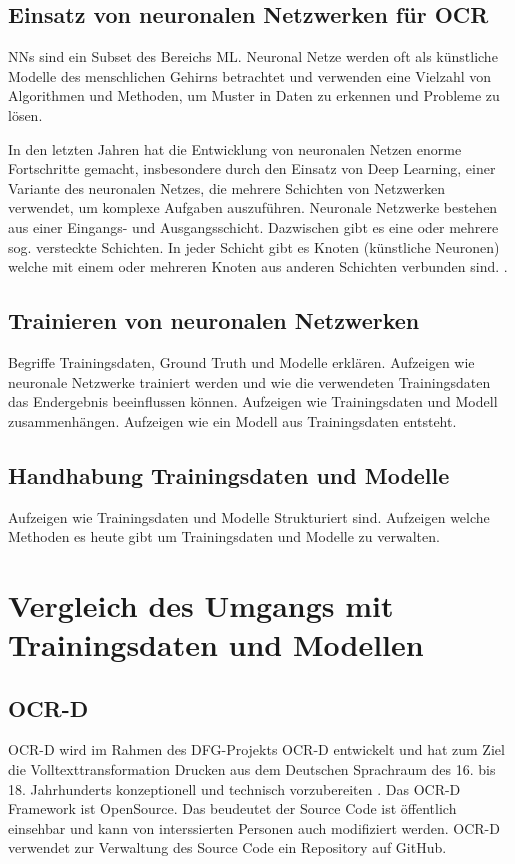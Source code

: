 \documentclass[a4paper,oneside, 12pt]{report}
\begin{document}
\section{Einsatz von neuronalen Netzwerken für OCR}
\acp{NN} sind ein Subset des Bereichs \ac{ML}. Neuronal Netze werden oft als künstliche Modelle des menschlichen Gehirns betrachtet und verwenden eine Vielzahl von Algorithmen und Methoden, um Muster in Daten zu erkennen und Probleme zu lösen.

In den letzten Jahren hat die Entwicklung von neuronalen Netzen enorme Fortschritte gemacht, insbesondere durch den Einsatz von Deep Learning, einer Variante des neuronalen Netzes, die mehrere Schichten von Netzwerken verwendet, um komplexe Aufgaben auszuführen. Neuronale Netzwerke bestehen aus einer Eingangs- und Ausgangsschicht. Dazwischen gibt es eine oder mehrere sog. versteckte Schichten. In jeder Schicht gibt es Knoten (künstliche Neuronen) welche mit einem oder mehreren Knoten aus anderen Schichten verbunden sind. \cite{ibmnn}. 


\section{Trainieren von neuronalen Netzwerken}
Begriffe Trainingsdaten, Ground Truth und Modelle erklären. Aufzeigen wie neuronale Netzwerke trainiert werden und wie die verwendeten Trainingsdaten das Endergebnis beeinflussen können. Aufzeigen wie Trainingsdaten und Modell zusammenhängen. Aufzeigen wie ein Modell aus Trainingsdaten entsteht. 
\section{Handhabung Trainingsdaten und Modelle}
Aufzeigen wie Trainingsdaten und Modelle Strukturiert sind.  Aufzeigen welche Methoden es heute gibt um Trainingsdaten und Modelle zu verwalten.
\chapter{Vergleich des Umgangs mit Trainingsdaten und Modellen}\label{sec:vergleich}

\section{OCR-D}
OCR-D wird im Rahmen des DFG-Projekts OCR-D entwickelt und hat zum Ziel die Volltexttransformation Drucken aus dem Deutschen Sprachraum des 16. bis 18. Jahrhunderts konzeptionell und technisch vorzubereiten \cite{standOCR-D}.  Das OCR-D Framework ist OpenSource. Das beudeutet der Source Code ist öffentlich einsehbar und kann von interssierten Personen auch modifiziert werden. OCR-D verwendet zur Verwaltung des Source Code ein Repository auf GitHub.\cite{ocrdgithub}
\end{document}
